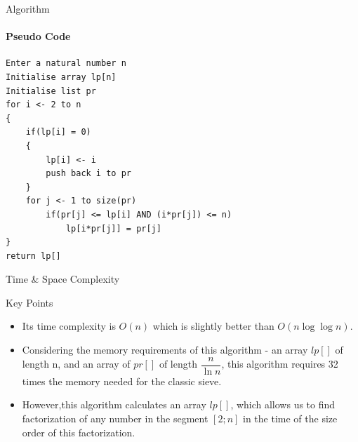 \documentclass{beamer}
\begin{document}
\begin{frame}[fragile]{Algorithm}
\framesubtitle{Pseudo Code}
\begin{verbatim}
Enter a natural number n
Initialise array lp[n]
Initialise list pr
for i <- 2 to n
{
    if(lp[i] = 0)
    {
        lp[i] <- i
        push back i to pr
    }
    for j <- 1 to size(pr)
        if(pr[j] <= lp[i] AND (i*pr[j]) <= n)
            lp[i*pr[j]] = pr[j]
}
return lp[]

\end{verbatim}
\end{frame}


\begin{frame}{Time \& Space Complexity}
    \begin{block}{Key Points}
    \begin{itemize}
        \item Its time complexity is $O\left( n\right) $ which is slightly better than $O\left( n\log \log n\right) $.
        \item Considering the memory requirements of this algorithm - an array $lp\left[ \right] $ of length n, and an array of $pr\left[ \right] $ of length $\dfrac {n}{\ln n}$, this algorithm requires 32 times the memory needed for the classic sieve.
        \item However,this algorithm calculates an array $lp\left[ \right] $, which allows us to find factorization of any number in the segment $\left[ 2;n\right] $ in the time of the size order of this factorization.
    \end{itemize}
    \end{block}
    
\end{frame}
\end{document}
